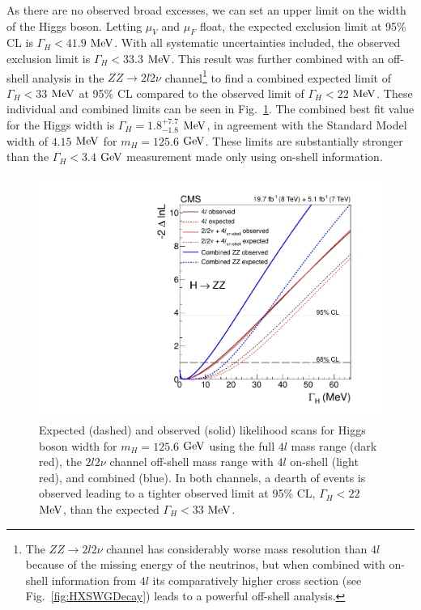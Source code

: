 As there are no observed broad excesses, we can set an upper limit on the width of the Higgs boson. Letting $\mu_V$ and $\mu_F$ float, the expected exclusion limit at 95\% CL is $\Gamma_{H}<41.9$ $\rm{MeV}$. With all systematic uncertainties included, the observed exclusion limit is $\Gamma_{H} < 33.3$ $\rm{MeV}$. This result was further combined with an off-shell analysis in the $ZZ \rightarrow 2l2\nu$ channel\footnote{The $ZZ \rightarrow 2l2\nu$ channel has considerably worse mass resolution than $4l$ because of the missing energy of the neutrinos, but when combined with on-shell information from $4l$ its comparatively higher cross section (see Fig.~\ref{fig:HXSWGDecay}) leads to a powerful off-shell analysis.} to find a combined expected limit of $\Gamma_{H} < 33$ $\rm{MeV}$ at 95\% CL compared to the observed limit of $\Gamma_{H} < 22$ $\rm{MeV}$. These individual and combined limits can be seen in Fig.~\ref{fig:WidthLimits}. The combined best fit value for the Higgs width is $\Gamma_{H} = 1.8^{+7.7}_{-1.8}$ $\rm{MeV}$, in agreement with the Standard Model width of $4.15$ $\rm{MeV}$ for $m_{H}=125.6$ $\rm{GeV}$. These limits are substantially stronger than the $\Gamma_H < 3.4$ $\rm{GeV}$ measurement made only using on-shell information.

\begin{figure}[htbp]
\begin{center}
\includegraphics[width=.8\linewidth]{HiggsProperties/figures/fig5_new.pdf}
\caption[Expected and Observed Limits on Higgs Width]{Expected (dashed) and observed (solid) likelihood scans for Higgs boson width for $m_{H}=125.6$ $\rm{GeV}$ using the full $4l$ mass range (dark red), the $2l2\nu$ channel off-shell mass range with $4l$ on-shell (light red), and combined (blue). In both channels, a dearth of events is observed leading to a tighter observed limit at 95\% CL, $\Gamma_{H} < 22$ $\rm{MeV}$, than the expected $\Gamma_{H} < 33$ $\rm{MeV}$.}
\label{fig:WidthLimits}
\end{center}
\end{figure}

